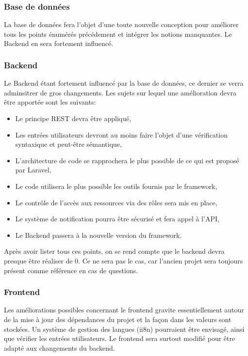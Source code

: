 \documentclass[
    iai, %
    il, %
]{heig-tb}
\begin{document}
\subsubsection{Base de données}
La base de données fera l'objet d'une toute nouvelle conception pour améliorer tous les points énumérés précédement et intégrer les notions manquantes. Le Backend en sera fortement influencé.

\subsubsection{Backend}
Le Backend étant fortement influencé par la base de données, ce dernier se verra adminsitrer de gros changements.
Les sujets sur lequel une amélioration devra être apportée sont les suivants:
\begin{itemize}
    \item Le principe REST devra être appliqué,
    \item Les entrées utilisateurs devront au moins faire l'objet d'une vérification syntaxique et peut-être sémantique,
    \item L'architecture de code se rapprochera le plus possible de ce qui est proposé par Laravel,
    \item Le code utilisera le plus possible les outils fournis par le framework,
    \item Le contrôle de l'accès aux ressources via des rôles sera mis en place,
    \item Le système de notification pourra être sécurisé et fera appel à l'API,
    \item Le Backend passera à la nouvelle version du framework.
\end{itemize}

Après avoir lister tous ces points, on se rend compte que le backend devra presque être réaliser de 0. Ce ne sera pas le cas, car l'ancien projet sera toujours présent comme référence en cas de questions.

\subsubsection{Frontend}
Les améliorations possibles concernant le frontend gravite essentiellement autour de la mise à jour des dépendances du projet et la façon dans les valeurs sont stockées. \newline
Un système de gestion des langues (ii8n) pourraient être envisagé, ainsi que vérifier les entrées utilisateurs.\newline
Le frontend sera surtout modifié pour être adapté aux changements du backend.
\end{document}
